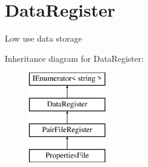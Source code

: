 \hypertarget{classOTA_1_1Misc_1_1DataRegister}{}\section{Data\+Register}
\label{classOTA_1_1Misc_1_1DataRegister}


Low use data storage  


Inheritance diagram for Data\+Register\+:\begin{figure}[H]
\begin{center}
\leavevmode
\includegraphics[height=4.000000cm]{classOTA_1_1Misc_1_1DataRegister}
\end{center}
\end{figure}
